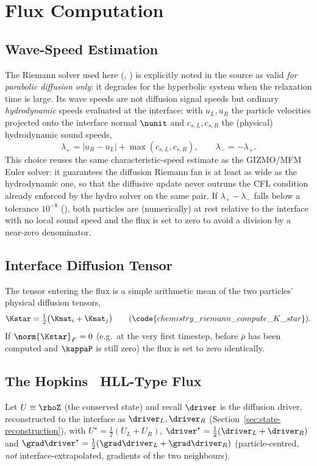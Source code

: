 \section{Flux Computation}
\label{sec:flux-computation}

\subsection{Wave-Speed Estimation}
The Riemann solver used here (,
) is explicitly noted in
the source as valid \emph{for parabolic diffusion only}: it degrades
for the hyperbolic system when the relaxation time is large. Its wave
speeds are not diffusion signal speeds but ordinary \emph{hydrodynamic}
speeds evaluated at the interface: with $u_L, u_R$ the particle
velocities projected onto the interface normal $\nunit$ and
$c_{s,L}, c_{s,R}$ the (physical) hydrodynamic sound speeds,
\begin{equation}
  \lambda_+ = |u_R - u_L| + \max(c_{s,L}, c_{s,R}) , \qquad \lambda_- = -\lambda_+ .
\end{equation}
This choice reuses the same characteristic-speed estimate as the
GIZMO/MFM Euler solver: it guarantees the diffusion Riemann fan is at
least as wide as the hydrodynamic one, so that the diffusive update never
outruns the CFL condition already enforced by the hydro solver on the
same pair. If $\lambda_+-\lambda_- $ falls below a tolerance
$10^{-8}$ (),
both particles are (numerically) at rest relative to the interface with
no local sound speed and the flux is set to zero to avoid a division by
a near-zero denominator.

\subsection{Interface Diffusion Tensor}
The tensor entering the flux is a simple arithmetic mean of the two
particles' physical diffusion tensors,
\begin{equation}
  \Kstar = \tfrac12\big(\Kmat_i + \Kmat_j\big)
  \qquad(\code{chemistry\_riemann\_compute\_K\_star}) .
\end{equation}
If $\norm{\Kstar}_F = 0$ (e.g.\ at the very first timestep, before
$\bar\rho$ has been computed and $\kappaP$ is still zero) the flux is
set to zero identically.

\subsection{The Hopkins~\citeyear{Hopkins2017diffusion} HLL-Type Flux}
\label{sec:hll-flux}
Let $U \equiv \rhoZ$ (the conserved state) and recall $\driver$ is the
diffusion driver, reconstructed to the interface as $\driver_L,
\driver_R$ (Section~\ref{sec:state-reconstruction}), with
$U^\star = \tfrac12(U_L+U_R)$, $\driver^\star = \tfrac12(\driver_L +
\driver_R)$ and $\grad\driver^\star = \tfrac12(\grad\driver_L +
\grad\driver_R)$ (particle-centred, \emph{not} interface-extrapolated,
gradients of the two neighbours).

